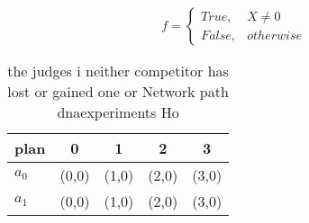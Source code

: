\documentclass[a4paper]{article}
\begin{document}
\begin{equation}   f =
\begin{cases} True, & X \neq 0\\
False, & otherwise
\end{cases}
\end{equation}

\begin{table}
\begin{adjustbox}{width=0.5\columnwidth}
\begin{tabular}{|l|l|l|l|l|}
\hline
\textbf{plan} & \multicolumn{1}{c|}{\textbf{0}} & \multicolumn{1}{c|}{\textbf{1}} & \multicolumn{1}{c|}{\textbf{2}} & \multicolumn{1}{c|}{\textbf{3}} \\ \hline
\textbf{$a_0$}  & (0,0) & (1,0) & (2,0) & (3,0) \\ \hline
\textbf{$a_1$}  & (0,0) & (1,0) & (2,0) & (3,0) \\ \hline
\end{tabular}
\end{adjustbox}
\caption{ the judges i neither competitor has lost or gained one or Network path dnaexperiments Ho
}
\end{table}
\end{document}
